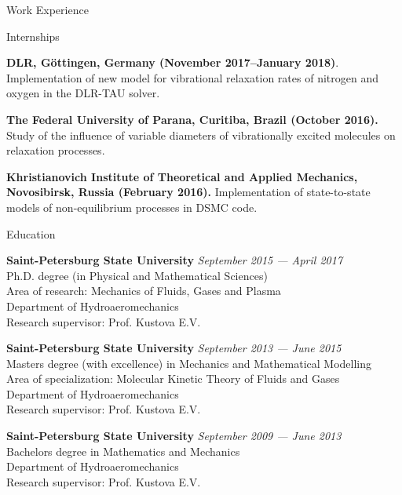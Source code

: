 \documentclass{resume} %
\begin{document}
\begin{rSection}{Work Experience}

\begin{rSubsection}{Internships}{}{}{}
\item \textbf{DLR, G\"{o}ttingen, Germany (November 2017--January 2018)}.
Implementation of new model for vibrational relaxation rates of nitrogen and oxygen in the DLR-TAU solver.

\item \textbf{The Federal University of Parana, Curitiba, Brazil (October 2016).}
Study of the influence of variable diameters of vibrationally excited molecules on relaxation processes.

\item \textbf{Khristianovich Institute of Theoretical and Applied Mechanics, Novosibirsk, Russia (February 2016).}
Implementation of state-to-state models of non-equilibrium processes in DSMC code.
\end{rSubsection}
\end{rSection}


\begin{rSection}{Education}

{\bf Saint-Petersburg State University} \hfill {\em September 2015 --- April 2017} \\ 
Ph.D. degree (in Physical and Mathematical Sciences)\\
Area of research: Mechanics of Fluids, Gases and Plasma \\
Department of Hydroaeromechanics \smallskip \\
Research supervisor: Prof. Kustova E.V.

{\bf Saint-Petersburg State University} \hfill {\em September 2013 --- June 2015} \\ 
Masters degree (with excellence) in Mechanics and Mathematical Modelling\\
Area of specialization: Molecular Kinetic Theory of Fluids and Gases\\
Department of Hydroaeromechanics \smallskip \\
Research supervisor: Prof. Kustova E.V.

{\bf Saint-Petersburg State University} \hfill {\em September 2009 --- June 2013} \\ 
Bachelors degree in Mathematics and Mechanics \\
Department of Hydroaeromechanics \smallskip \\
Research supervisor: Prof. Kustova E.V.
\end{rSection}
\end{document}
